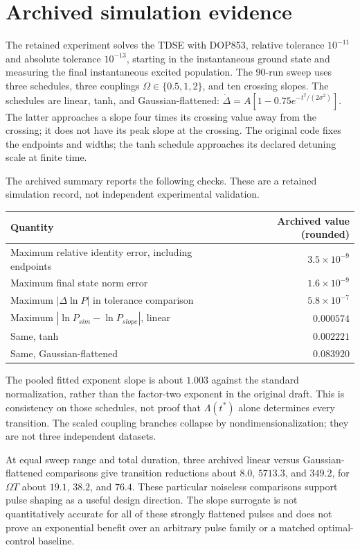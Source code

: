 \documentclass[11pt]{article}
\begin{document}
\section{Archived simulation evidence}
The retained experiment solves the TDSE with DOP853, relative tolerance
$10^{-11}$ and absolute tolerance $10^{-13}$, starting in the instantaneous
ground state and measuring the final instantaneous excited population.
The 90-run sweep uses three schedules, three couplings $\Omega\in\{0.5,1,2\}$,
and ten crossing slopes. The schedules are linear, tanh, and Gaussian-flattened:
$\dot\Delta=A[1-0.75e^{-t^2/(2\sigma^2)}]$. The latter approaches a slope
four times its crossing value away from the crossing; it does not have its
peak slope at the crossing. The original code fixes the endpoints and widths;
the tanh schedule approaches its declared detuning scale at finite time.

The archived summary reports the following checks. These are a retained
simulation record, not independent experimental validation.
\begin{center}
\begin{tabular}{@{}lr@{}}
\toprule
Quantity & Archived value (rounded)\\
\midrule
Maximum relative identity error, including endpoints & $3.5\times10^{-9}$\\
Maximum final state norm error & $1.6\times10^{-9}$\\
Maximum $|\Delta\ln P|$ in tolerance comparison & $5.8\times10^{-7}$\\
Maximum $|\ln P_{sim}-\ln P_{slope}|$, linear & $0.000574$\\
Same, tanh & $0.002221$\\
Same, Gaussian-flattened & $0.083920$\\
\bottomrule
\end{tabular}
\end{center}
The pooled fitted exponent slope is about $1.003$ against the standard
normalization, rather than the factor-two exponent in the original draft.
This is consistency on those schedules, not proof that $\Lambda(t^*)$ alone
determines every transition. The scaled coupling branches collapse by
nondimensionalization; they are not three independent datasets.

At equal sweep range and total duration, three archived linear versus
Gaussian-flattened comparisons give transition reductions about $8.0$,
$5713.3$, and $349.2$, for $\Omega T$ about $19.1$, $38.2$, and $76.4$.
These particular noiseless comparisons support pulse shaping as a useful
design direction. The slope surrogate is not quantitatively accurate for
all of these strongly flattened pulses and does not prove an exponential
benefit over an arbitrary pulse family or a matched optimal-control baseline.
\end{document}
